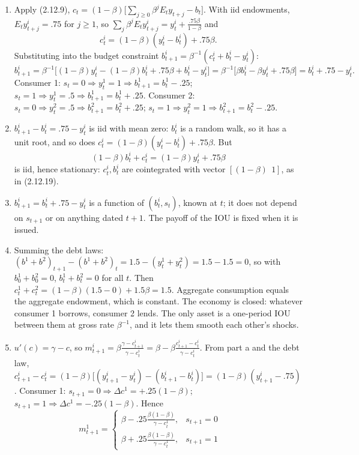 \documentclass[12pt, letterpaper]{article}
\begin{document}
\begin{tcolorbox}[oddbox,title={Exercise 2.27 \quad Permanent Income Model Again}]
\begin{enumerate}
\item Apply (2.12.9), $c_t=(1-\beta)\big[\sum_{j\ge0}\beta^jE_ty_{t+j}-b_t\big]$. With iid endowments,
$E_ty^i_{t+j}=.75$ for $j\ge1$, so $\sum_j\beta^jE_ty^i_{t+j}=y^i_t+\frac{.75\beta}{1-\beta}$ and
\[
\boxed{c^i_t=(1-\beta)(y^i_t-b^i_t)+.75\beta}.
\]
Substituting into the budget constraint $b^i_{t+1}=\beta^{-1}(c^i_t+b^i_t-y^i_t)$:
\[
b^i_{t+1}=\beta^{-1}\big[(1-\beta)y^i_t-(1-\beta)b^i_t+.75\beta+b^i_t-y^i_t\big]
=\beta^{-1}\big[\beta b^i_t-\beta y^i_t+.75\beta\big]=b^i_t+.75-y^i_t .
\]
Consumer 1: $s_t=0\Rightarrow y^1_t=1\Rightarrow b^1_{t+1}=b^1_t-.25$; $s_t=1\Rightarrow y^1_t=.5\Rightarrow
b^1_{t+1}=b^1_t+.25$. Consumer 2: $s_t=0\Rightarrow y^2_t=.5\Rightarrow b^2_{t+1}=b^2_t+.25$;
$s_t=1\Rightarrow y^2_t=1\Rightarrow b^2_{t+1}=b^2_t-.25$. \checkmark
\item $b^i_{t+1}-b^i_t=.75-y^i_t$ is iid with mean zero: $b^i_t$ is a random walk, so it has a unit
root, and so does $c^i_t=(1-\beta)(y^i_t-b^i_t)+.75\beta$. But
\[
(1-\beta)b^i_t+c^i_t=(1-\beta)y^i_t+.75\beta
\]
is iid, hence stationary: $c^i_t,b^i_t$ are cointegrated with vector $[(1-\beta)\ \ 1]$, as in (2.12.19).
\item $b^i_{t+1}=b^i_t+.75-y^i_t$ is a function of $(b^i_t,s_t)$, known at $t$; it does not depend on
$s_{t+1}$ or on anything dated $t+1$. The payoff of the IOU is fixed when it is issued.
\item Summing the debt laws: $(b^1+b^2)_{t+1}-(b^1+b^2)_t=1.5-(y^1_t+y^2_t)=1.5-1.5=0$, so with
$b^1_0+b^2_0=0$, $\boxed{b^1_t+b^2_t=0}$ for all $t$. Then
$c^1_t+c^2_t=(1-\beta)(1.5-0)+1.5\beta=\boxed{1.5}$. Aggregate consumption equals the aggregate
endowment, which is constant. The economy is closed: whatever consumer 1 borrows, consumer 2 lends.
The only asset is a one-period IOU between them at gross rate $\beta^{-1}$, and it lets them smooth
each other's shocks.
\item $u'(c)=\gamma-c$, so $m^i_{t+1}=\beta\frac{\gamma-c^i_{t+1}}{\gamma-c^i_t}=\beta-\beta\frac{c^i_{t+1}-c^i_t}{\gamma-c^i_t}$.
From part a and the debt law,
$c^i_{t+1}-c^i_t=(1-\beta)\big[(y^i_{t+1}-y^i_t)-(b^i_{t+1}-b^i_t)\big]=(1-\beta)(y^i_{t+1}-.75)$. Consumer
1: $s_{t+1}=0\Rightarrow\Delta c^1=+.25(1-\beta)$; $s_{t+1}=1\Rightarrow\Delta c^1=-.25(1-\beta)$. Hence
\[
m^1_{t+1}=\begin{cases}\beta-.25\frac{\beta(1-\beta)}{\gamma-c^1_t},&s_{t+1}=0\\[3pt]
\beta+.25\frac{\beta(1-\beta)}{\gamma-c^1_t},&s_{t+1}=1\end{cases}\qquad
\]
\end{enumerate}
\end{tcolorbox}
\end{document}
